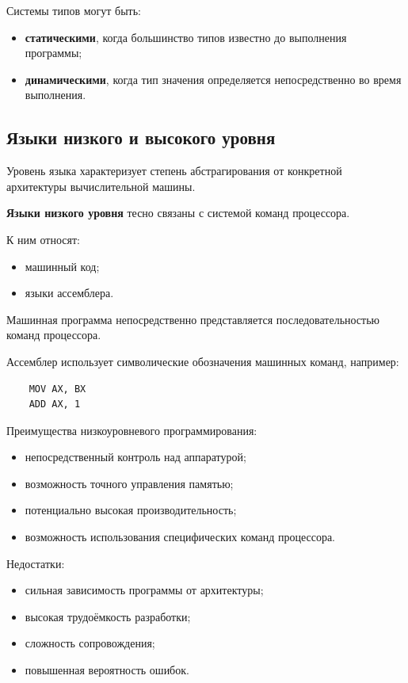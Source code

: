 Системы типов могут быть:
\begin{itemize}
	\item \textbf{статическими}, когда большинство типов известно до выполнения программы;
	\item \textbf{динамическими}, когда тип значения определяется непосредственно во время выполнения.
\end{itemize}


\subsection{Языки низкого и высокого уровня}

Уровень языка характеризует степень абстрагирования от конкретной архитектуры вычислительной машины.

\textbf{Языки низкого уровня} тесно связаны с системой команд процессора.

К ним относят:
\begin{itemize}
	\item машинный код;
	\item языки ассемблера.
\end{itemize}

Машинная программа непосредственно представляется последовательностью команд процессора.

Ассемблер использует символические обозначения машинных команд, например:

\begin{verbatim}
	MOV AX, BX
	ADD AX, 1
\end{verbatim}

Преимущества низкоуровневого программирования:
\begin{itemize}
	\item непосредственный контроль над аппаратурой;
	\item возможность точного управления памятью;
	\item потенциально высокая производительность;
	\item возможность использования специфических команд процессора.
\end{itemize}

Недостатки:
\begin{itemize}
	\item сильная зависимость программы от архитектуры;
	\item высокая трудоёмкость разработки;
	\item сложность сопровождения;
	\item повышенная вероятность ошибок.
\end{itemize}

